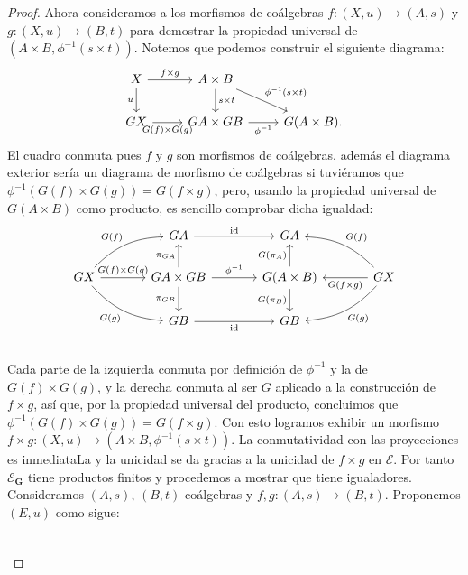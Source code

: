 \begin{proof}
  Ahora consideramos a los morfismos de coálgebras $f\colon (X,u)\to (A,s)$ y $g\colon (X,u)\to (B,t)$ para demostrar
  la propiedad universal de $(A\times B, \phi^{-1}(s\times t))$. Notemos que podemos construir el siguiente diagrama:
  \begin{equation*}
    \begin{tikzcd}
      X\ar[swap]{d}{u}\ar{r}{f\times g} & A\times B\ar{dr}{\phi^{-1}(s\times t)}\ar{d}{s\times t} \\
      GX\ar[swap]{r}{G(f)\times G(g)} & GA\times GB\ar[swap]{r}{\phi^{-1}} & G(A\times B).
    \end{tikzcd}
  \end{equation*}
  El cuadro conmuta pues $f$ y $g$ son morfismos de coálgebras, además el diagrama exterior sería un 
  diagrama de morfismo de coálgebras si tuviéramos que $\phi^{-1}(G(f)\times G(g))=G(f\times g)$,
  pero, usando la propiedad universal de $G(A\times B)$ como producto, es sencillo comprobar dicha igualdad:
  \begin{equation*}
    \begin{tikzcd}[column sep=large]
      {} & {GA}\ar{r}{\text{id}} & GA \\
      GX\ar[bend left = 5ex]{ru}{G(f)}\ar[swap, bend right = 5ex]{rd}{G(g)}\ar{r}{G(f)\times G(g)} & GA\times GB\ar{r}{\phi^{-1}}\ar{u}{\pi_{GA}}\ar[swap]{d}{\pi_{GB}} & G(A\times B)\ar{u}{G(\pi_A)}\ar[swap]{d}{G(\pi_B)} & GX\ar[swap, bend right = 5ex]{lu}{G(f)}\ar[bend left = 5ex]{ld}{G(g)}\ar{l}{G(f\times g)}\\
      {} & {GB}\ar[swap]{r}{\text{id}} & GB \\
    \end{tikzcd}
  \end{equation*}
  Cada parte de la izquierda conmuta por definición de $\phi^{-1}$ y la de $G(f)\times G(g)$,
  y la derecha conmuta al ser $G$ aplicado a la construcción de $f\times g$, así que, por la propiedad universal del producto, concluimos que $\phi^{-1}(G(f)\times G(g))=G(f\times g)$. Con esto logramos
  exhibir un morfismo $f\times g\colon (X,u)\to (A\times B,\phi^{-1}(s\times t))$. La conmutatividad con las proyecciones es inmediataLa y la unicidad
  se da gracias a la unicidad de $f\times g$ en $\mathcal{E}$. Por tanto $\mathcal{E}_\textbf{G}$
  tiene productos finitos y procedemos a mostrar que tiene igualadores. Consideramos $(A,s)$,
  $(B,t)$ coálgebras y $f,g\colon (A,s)\to (B,t)$. Proponemos $(E,u)$ como sigue:
  \begin{equation*}
    \begin{tikzcd}

\end{tikzcd}
\end{equation*}
\end{proof}
